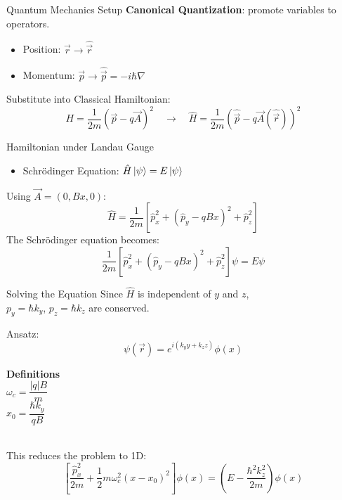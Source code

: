 \documentclass[aspectratio=169, 14pt, t]{beamer}
\begin{document}
\begin{frame}{Quantum Mechanics Setup}
    \textbf{Canonical Quantization}: promote variables to operators.
    \begin{itemize}
        \item Position: $\vec{r} \to \hat{\vec{r}}$
        \item Momentum: $\vec{p} \to \hat{\vec{p}} = -i\hbar\nabla$
    \end{itemize}
    
    \vspace{0.5cm}
    Substitute into Classical Hamiltonian:
    \[ H = \frac{1}{2m}(\vec{p} - q\vec{A})^2 \quad \longrightarrow \quad \hat{H} = \frac{1}{2m}(\hat{\vec{p}} - q\vec{A}(\hat{\vec{r}}))^2 \]
\end{frame}
\begin{frame}{Hamiltonian under Landau Gauge}
    \begin{itemize}
        \item Schrödinger Equation: $\hat{H}\ket{\psi} = E\ket{\psi}$
    \end{itemize}\vspace{0.5cm}
    Using $\vec{A} = (0, Bx, 0)$:
    \[
        \hat{H} = \frac{1}{2m}\left[ \hat{p}_x^2 + (\hat{p}_y - qBx)^2 + \hat{p}_z^2 \right]
    \]
    The Schrödinger equation becomes:
    \[
        \frac{1}{2m}\left[ \hat{p}_x^2 + (\hat{p}_y - qBx)^2 + \hat{p}_z^2 \right] \psi = E\psi
    \]
\end{frame}

\begin{frame}{Solving the Equation}
    Since $\hat{H}$ is independent of $y$ and $z$, \\$p_y = \hbar k_y$, $p_z = \hbar k_z$ are conserved.\\[0.1cm]
    \begin{minipage}[t]{0.62\textwidth}Ansatz:
    \[ \psi(\vec{r}) = e^{i(k_y y + k_z z)} \phi(x) \]
    \end{minipage}\hfill\vline\hfill
    \begin{minipage}[t]{0.34\textwidth}
        \small
        \textbf{Definitions}\\[0.2cm]
        $\omega_c = \dfrac{|q|B}{m}$\\[0.2cm]
        $x_0 = \dfrac{\hbar k_y}{qB}$
    \end{minipage}\\[0.1cm]
    This reduces the problem to 1D:
    \[
        \left[ \frac{\hat{p}_x^2}{2m} + \frac{1}{2}m\omega_c^2(x - x_0)^2 \right]\phi(x) = \left(E - \frac{\hbar^2 k_z^2}{2m}\right) \phi(x)
    \]
    \vspace{0.5cm}
\end{frame}
\end{document}
